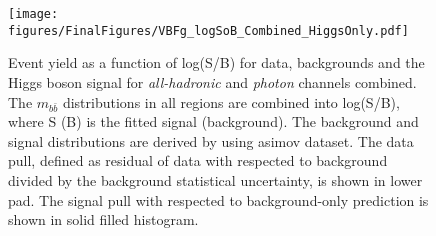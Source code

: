 \documentclass[PAPER, american,coverpage,texlive=2016, english]{\ATLASLATEXPATH atlasdoc}
\providecommand{\DIFaddbeginFL}{} %
\providecommand{\DIFaddendFL}{} %
\providecommand{\DIFdelbeginFL}{} %
\providecommand{\DIFdelendFL}{} %
\begin{document}


\begin{figure}[tbph]
  \begin{center}
    \DIFdelbeginFL %
\DIFdelendFL \DIFaddbeginFL \texttt{[image: figures/FinalFigures/VBFg\_logSoB\_Combined\_HiggsOnly.pdf]}
    \DIFaddendFL \caption{Event yield as a function of log(S/B) for data, backgrounds and the Higgs boson signal for \textit{all-hadronic} and \textit{photon} channels combined. The $m_{b\bar{b}}$ distributions in all regions are combined into log(S/B), where S (B) is the fitted signal (background). The background and signal distributions are derived by using asimov dataset. The data pull, defined as residual of data with respected to background divided by the background statistical uncertainty, is shown in lower pad. The signal pull with respected to background-only prediction is shown in solid filled histogram.}
    \label{fig:logSoB_combined_Higgs}
  \end{center}
\end{figure}
\end{document}
